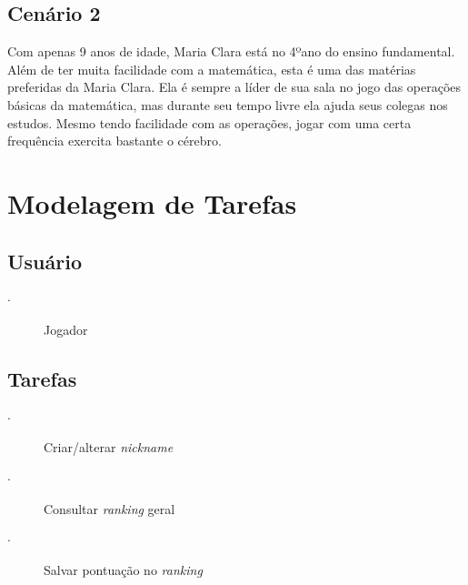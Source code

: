 \documentclass[
    12pt,               %
    openany,          	%
    twoside,            %
    a4paper,            %
    brazil              %
    ]{abntex2}
\begin{document}
\section{Cenário 2}
Com apenas 9 anos de idade, Maria Clara está no 4ºano do ensino fundamental. Além
de ter muita facilidade com a matemática, esta é uma das matérias preferidas da
Maria Clara. Ela é sempre a líder de sua sala no jogo das operações básicas da
matemática, mas durante seu tempo livre ela ajuda seus colegas nos estudos.
Mesmo tendo facilidade com as operações, jogar com uma certa frequência
exercita bastante o cérebro.

\chapter{Modelagem de Tarefas}

\section{Usuário}

\begin{description}
\item[$\cdot$] Jogador
\end{description}

\section{Tarefas}
\begin{description}
\item[$\cdot$] Criar/alterar \textit{nickname}
\item[$\cdot$] Consultar \textit{ranking} geral
\item[$\cdot$] Salvar pontuação no \textit{ranking}
\end{description}
\end{document}
